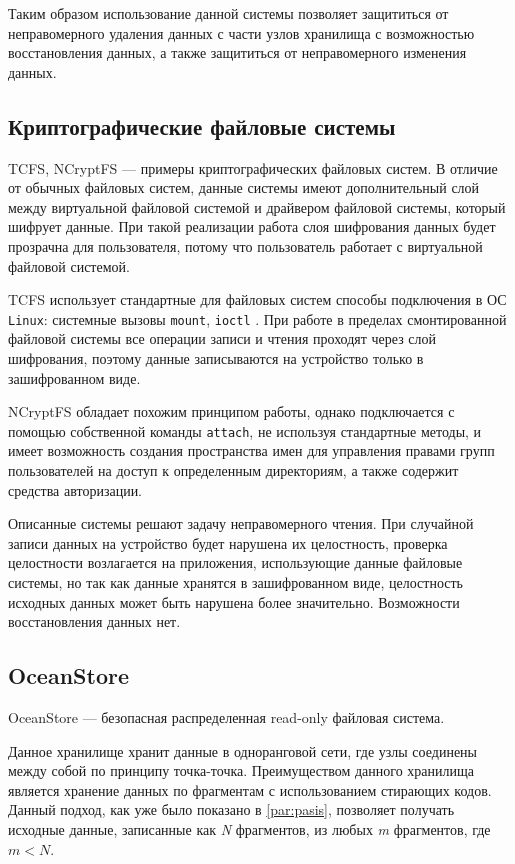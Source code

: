 Таким образом использование данной системы позволяет защититься от неправомерного удаления данных с части узлов хранилища с возможностью восстановления данных, а также защититься от неправомерного изменения данных.

\subsection{Криптографические файловые системы}

TCFS\cite{tcfs}, NCryptFS\cite{ncryptfs} --- примеры криптографических файловых систем. В отличие от обычных файловых систем, данные системы имеют дополнительный слой между виртуальной файловой системой и драйвером файловой системы, который шифрует данные. При такой реализации работа слоя шифрования данных будет прозрачна для пользователя, потому что пользователь работает с виртуальной файловой системой.

TCFS использует стандартные для файловых систем способы подключения в ОС \texttt{Linux}: системные вызовы \texttt{mount}, \texttt{ioctl} \cite{linux}. При работе в пределах смонтированной файловой системы все операции записи и чтения проходят через слой шифрования, поэтому данные записываются на устройство только в зашифрованном виде.

NCryptFS обладает похожим принципом работы, однако подключается с помощью собственной команды \texttt{attach}, не используя стандартные методы, и имеет возможность создания пространства имен для управления правами групп пользователей на доступ к определенным директориям, а также содержит средства авторизации.

Описанные системы решают задачу неправомерного чтения. При случайной записи данных на устройство будет нарушена их целостность, проверка целостности возлагается на приложения, использующие данные файловые системы, но так как данные хранятся в зашифрованном виде, целостность исходных данных может быть нарушена более значительно. Возможности восстановления данных нет.

\subsection{OceanStore}
\label{par:ocean}

OceanStore\cite{ocean} --- безопасная распределенная read-only файловая система.

Данное хранилище хранит данные в одноранговой сети, где узлы соединены между собой по принципу точка-точка. Преимуществом данного хранилища является хранение данных по фрагментам с использованием стирающих кодов. Данный подход, как уже было показано в \ref{par:pasis}, позволяет получать исходные данные, записанные как \textit{N} фрагментов, из любых \textit{m} фрагментов, где $m < N$.

